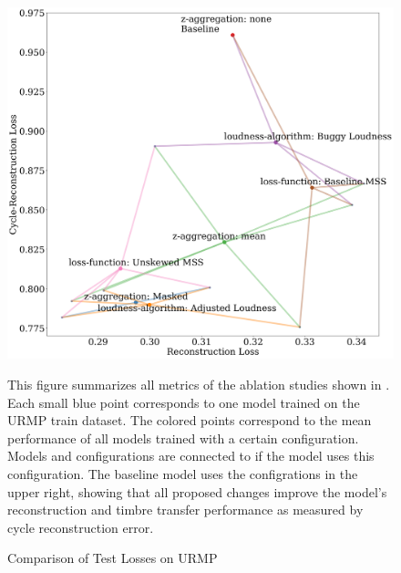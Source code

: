 \begin{figure}
    \centering
    \includegraphics[width=\textwidth]{figures/ablations.png}
    \caption{Comparison of Test Losses on URMP}
    \label{fig:ablations}
    \small{This figure summarizes all metrics of the ablation studies shown in . Each small blue point corresponds to one model trained on the URMP train dataset. The colored points correspond to the mean performance of all models trained with a certain configuration. Models and configurations are connected to if the model uses this configuration. The baseline model uses the configrations in the upper right, showing that all proposed changes improve the model's reconstruction and timbre transfer performance as measured by cycle reconstruction error.}
\end{figure}

